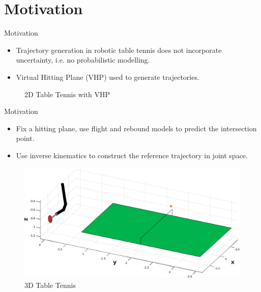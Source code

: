 \documentclass[handout]{beamer}
\begin{document}
\section{Motivation}
%
\begin{frame}{Motivation}
\begin{itemize}
\item Trajectory generation in robotic table tennis does not incorporate uncertainty, i.e. no probabilistic modelling.
\item Virtual Hitting Plane (VHP) used to generate trajectories.
\end{itemize}
\begin{figure}[t!]
\center
\caption{2D Table Tennis with VHP}
\label{robot1}
\end{figure}
\end{frame}
%
\begin{frame}{Motivation}
\begin{itemize}
\item Fix a hitting plane, use flight and rebound models to predict the intersection point. 
\item Use inverse kinematics to construct the reference trajectory in joint space.
\end{itemize}
\begin{figure}[t!]
\center
\includegraphics[scale=0.30]{tableTennis3D.eps}			
\caption{3D Table Tennis}
\label{robot2}
\end{figure}
\end{frame}
\end{document}
